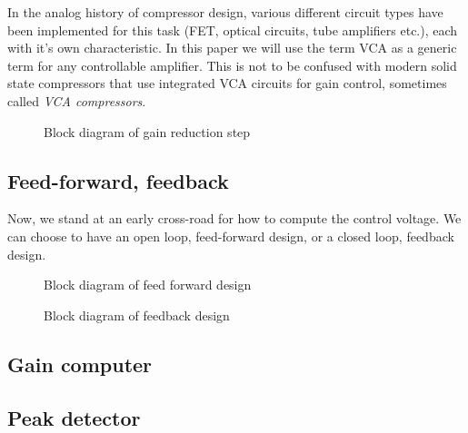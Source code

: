 \documentclass[]{article}
\begin{document}
In the analog history of compressor design, various different circuit types have been implemented for this task (FET, optical circuits, tube amplifiers etc.), each with it's own characteristic. In this paper we will use the term VCA as a generic term for any controllable amplifier. This is not to be confused with modern solid state compressors that use integrated VCA circuits for gain control, sometimes called \emph{VCA compressors}.


\begin{figure}[ht]
\centering

\caption{Block diagram of gain reduction step} 
\label{fig:vca-generic-blockdiagram}
\end{figure}





\subsection{Feed-forward, feedback}
Now, we stand at an early cross-road for how to compute the control voltage. We can choose to have an open loop, feed-forward design, or a closed loop, feedback design.

\begin{figure}[ht]
\centering

\caption{Block diagram of feed forward design} 
\label{fig:feedforward-blockdiagram}
\end{figure}

\begin{figure}[ht]
\centering

\caption{Block diagram of feedback design} 
\label{fig:feedback-blockdiagram}
\end{figure}

\subsection{Gain computer}
\subsection{Peak detector}



\end{document}
